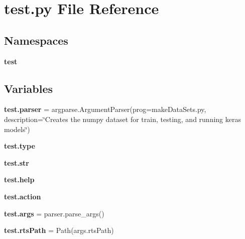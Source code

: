 \section{test.\+py File Reference}
\label{test_8py}
\subsection*{Namespaces}
\begin{DoxyCompactItemize}
\item 
 \textbf{ test}
\end{DoxyCompactItemize}
\subsection*{Variables}
\begin{DoxyCompactItemize}
\item 
\textbf{ test.\+parser} = argparse.\+Argument\+Parser(prog=\textquotesingle{}make\+Data\+Sets.\+py\textquotesingle{}, description=\char`\"{}Creates the numpy dataset for train, testing, and running keras models\char`\"{})
\item 
\textbf{ test.\+type}
\item 
\textbf{ test.\+str}
\item 
\textbf{ test.\+help}
\item 
\textbf{ test.\+action}
\item 
\textbf{ test.\+args} = parser.\+parse\+\_\+args()
\item 
\textbf{ test.\+rts\+Path} = Path(args.\+rts\+Path)
\end{DoxyCompactItemize}
